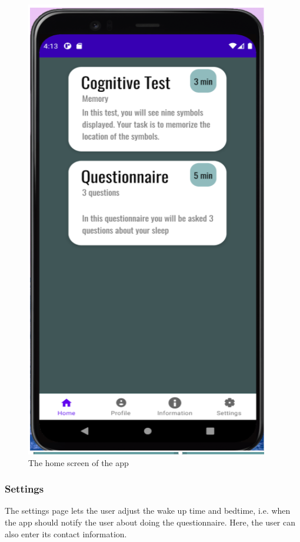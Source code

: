\documentclass{article}
\begin{document}
\begin{figure}[H]
  \begin{center}
    \includegraphics[scale=0.8]{Android1.png}
    \caption{The home screen of the app
}
    \label{fig:android1}
  \end{center}
\end{figure}

\subsubsection{Settings}
The settings page lets the user adjust the wake up time and bedtime, i.e. when the app should notify the user about doing the questionnaire. Here, the user can also enter its contact information.
\end{document}
